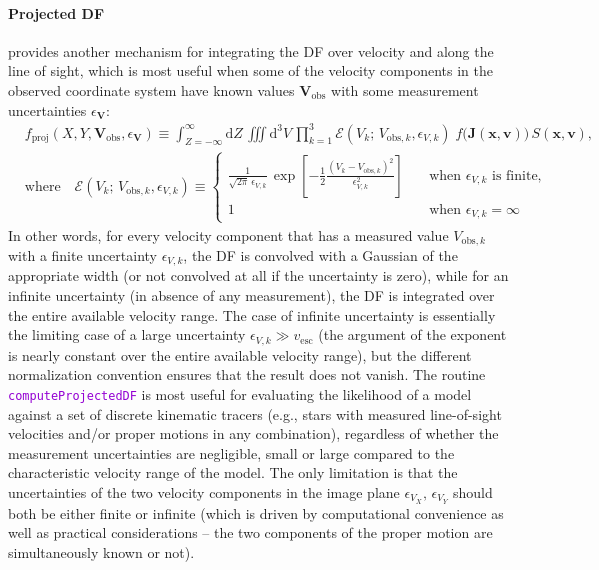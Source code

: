 \documentclass[12pt]{article}
\newcommand{\ttt}[1]{\textcolor{darkviolet}{\texttt{#1}}}
\renewcommand{\d}{\mathrm{d}}
\newcommand{\bv}{\boldsymbol{v}}
\newcommand{\bx}{\boldsymbol{x}}
\newcommand{\bV}{\boldsymbol{V}}
\newcommand{\bJ}{\boldsymbol{J}}
\begin{document}
\paragraph{Projected DF}  \label{sec:ProjectedDF} provides another mechanism for integrating the DF over velocity and along the line of sight, which is most useful when some of the velocity components in the observed coordinate system have known values $\bV_\mathrm{\!\!obs}$ with some measurement uncertainties $\epsilon_{\bV}$:
\begin{align*}
&f_\mathrm{proj}(X, Y, \bV_\mathrm{\!\!obs}, \epsilon_{\bV}) \equiv \int_{Z=-\infty}^\infty \d Z\, \iiint \d^3V\, \prod_{k=1}^3 \mathcal E(V_k;\,V_{\mathrm{obs},k}, \epsilon_{V,k})\;
f\big(\bJ(\bx,\bv)\big)\,S(\bx,\bv) ,\\
&\mbox{where}\quad \mathcal E(V_k;\,V_{\mathrm{obs},k}, \epsilon_{V,k}) \equiv
\left\{ \begin{array}{ll} \displaystyle \frac{1}{\sqrt{2\pi}\,\epsilon_{V,k}}\, \exp\left[-\frac{1}{2} \frac{(V_k-V_{\mathrm{obs},k})^2}{\epsilon_{V,k}^2} \right] &\quad\mbox{when }\epsilon_{V,k}\mbox{ is finite}, \\[6mm]
\displaystyle 1 & \quad\mbox{when }\epsilon_{V,k}=\infty \end{array} \right.
\end{align*}
In other words, for every velocity component that has a measured value $V_{\mathrm{obs},k}$ with a finite uncertainty $\epsilon_{V,k}$, the DF is convolved with a Gaussian of the appropriate width (or not convolved at all if the uncertainty is zero), while for an infinite uncertainty (in absence of any measurement), the DF is integrated over the entire available velocity range. The case of infinite uncertainty is essentially the limiting case of a large uncertainty $\epsilon_{V,k} \gg v_\mathrm{esc}$ (the argument of the exponent is nearly constant over the entire available velocity range), but the different normalization convention ensures that the result does not vanish. The routine \ttt{computeProjectedDF} is most useful for evaluating the likelihood of a model against a set of discrete kinematic tracers (e.g., stars with measured line-of-sight velocities and/or proper motions in any combination), regardless of whether the measurement uncertainties are negligible, small or large compared to the characteristic velocity range of the model. The only limitation is that the uncertainties of the two velocity components in the image plane $\epsilon_{V_X},\, \epsilon_{V_Y}$ should both be either finite or infinite (which is driven by computational convenience as well as practical considerations -- the two components of the proper motion are simultaneously known or not).
\end{document}
